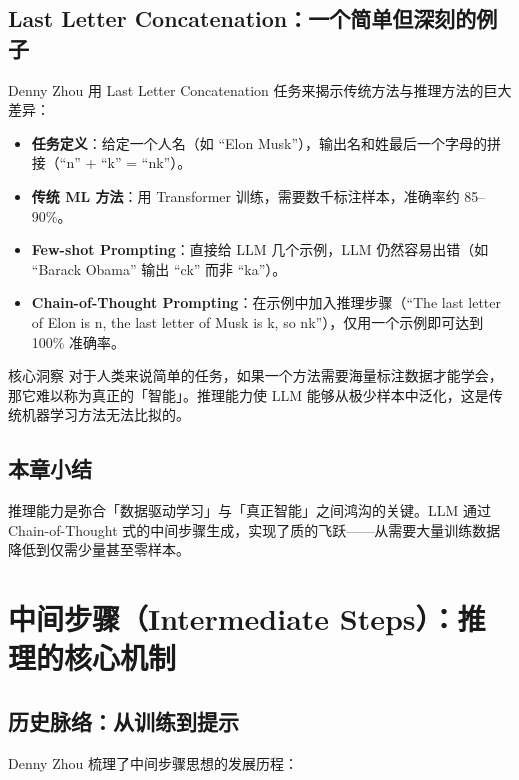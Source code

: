 \documentclass[a4paper]{article}
\begin{document}
\subsection{Last Letter Concatenation：一个简单但深刻的例子}

Denny Zhou 用 Last Letter Concatenation 任务来揭示传统方法与推理方法的巨大差异：

\begin{itemize}
    \item \textbf{任务定义}：给定一个人名（如 ``Elon Musk''），输出名和姓最后一个字母的拼接（``n'' + ``k'' = ``nk''）。
    \item \textbf{传统 ML 方法}：用 Transformer 训练，需要数千标注样本，准确率约 85--90\%。
    \item \textbf{Few-shot Prompting}：直接给 LLM 几个示例，LLM 仍然容易出错（如 ``Barack Obama'' 输出 ``ck'' 而非 ``ka''）。
    \item \textbf{Chain-of-Thought Prompting}：在示例中加入推理步骤（``The last letter of Elon is n, the last letter of Musk is k, so nk''），仅用一个示例即可达到 100\% 准确率。
\end{itemize}

\begin{importantbox}{核心洞察}
对于人类来说简单的任务，如果一个方法需要海量标注数据才能学会，那它难以称为真正的「智能」。推理能力使 LLM 能够从极少样本中泛化，这是传统机器学习方法无法比拟的。
\end{importantbox}

\subsection{本章小结}

推理能力是弥合「数据驱动学习」与「真正智能」之间鸿沟的关键。LLM 通过 Chain-of-Thought 式的中间步骤生成，实现了质的飞跃——从需要大量训练数据降低到仅需少量甚至零样本。

\section{中间步骤（Intermediate Steps）：推理的核心机制}

\subsection{历史脉络：从训练到提示}

Denny Zhou 梳理了中间步骤思想的发展历程：
\end{document}
